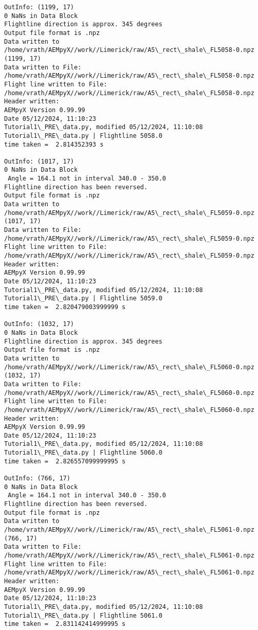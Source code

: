 \documentclass[11pt]{article}
\begin{document}
\begin{Verbatim}[commandchars=\\\{\}]
OutInfo: (1199, 17)
0 NaNs in Data Block
Flightline direction is approx. 345 degrees
Output file format is .npz
Data written to
/home/vrath/AEMpyX//work//Limerick/raw/A5\_rect\_shale\_FL5058-0.npz
(1199, 17)
Data written to File:
/home/vrath/AEMpyX//work//Limerick/raw/A5\_rect\_shale\_FL5058-0.npz
Flight line written to File:
/home/vrath/AEMpyX//work//Limerick/raw/A5\_rect\_shale\_FL5058-0.npz
Header written:
AEMpyX Version 0.99.99
Date 05/12/2024, 11:10:23
Tutorial1\_PRE\_data.py, modified 05/12/2024, 11:10:08
Tutorial1\_PRE\_data.py | Flightline 5058.0
time taken =  2.814352393 s

OutInfo: (1017, 17)
0 NaNs in Data Block
 Angle = 164.1 not in interval 340.0 - 350.0
Flightline direction has been reversed.
Output file format is .npz
Data written to
/home/vrath/AEMpyX//work//Limerick/raw/A5\_rect\_shale\_FL5059-0.npz
(1017, 17)
Data written to File:
/home/vrath/AEMpyX//work//Limerick/raw/A5\_rect\_shale\_FL5059-0.npz
Flight line written to File:
/home/vrath/AEMpyX//work//Limerick/raw/A5\_rect\_shale\_FL5059-0.npz
Header written:
AEMpyX Version 0.99.99
Date 05/12/2024, 11:10:23
Tutorial1\_PRE\_data.py, modified 05/12/2024, 11:10:08
Tutorial1\_PRE\_data.py | Flightline 5059.0
time taken =  2.820479003999999 s

OutInfo: (1032, 17)
0 NaNs in Data Block
Flightline direction is approx. 345 degrees
Output file format is .npz
Data written to
/home/vrath/AEMpyX//work//Limerick/raw/A5\_rect\_shale\_FL5060-0.npz
(1032, 17)
Data written to File:
/home/vrath/AEMpyX//work//Limerick/raw/A5\_rect\_shale\_FL5060-0.npz
Flight line written to File:
/home/vrath/AEMpyX//work//Limerick/raw/A5\_rect\_shale\_FL5060-0.npz
Header written:
AEMpyX Version 0.99.99
Date 05/12/2024, 11:10:23
Tutorial1\_PRE\_data.py, modified 05/12/2024, 11:10:08
Tutorial1\_PRE\_data.py | Flightline 5060.0
time taken =  2.826557099999995 s

OutInfo: (766, 17)
0 NaNs in Data Block
 Angle = 164.1 not in interval 340.0 - 350.0
Flightline direction has been reversed.
Output file format is .npz
Data written to
/home/vrath/AEMpyX//work//Limerick/raw/A5\_rect\_shale\_FL5061-0.npz
(766, 17)
Data written to File:
/home/vrath/AEMpyX//work//Limerick/raw/A5\_rect\_shale\_FL5061-0.npz
Flight line written to File:
/home/vrath/AEMpyX//work//Limerick/raw/A5\_rect\_shale\_FL5061-0.npz
Header written:
AEMpyX Version 0.99.99
Date 05/12/2024, 11:10:23
Tutorial1\_PRE\_data.py, modified 05/12/2024, 11:10:08
Tutorial1\_PRE\_data.py | Flightline 5061.0
time taken =  2.831142414999995 s


\end{Verbatim}
\end{document}
